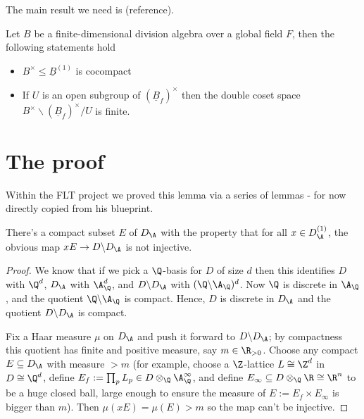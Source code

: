 The main result we need is (reference).%

\begin{lemma}\label{Fujisaki}
    Let $B$ be a finite-dimensional division algebra over a global field $F$, then the following
    statements hold
    \begin{itemize}
        \item $B^\times \leq \underline{B}^{(1)}$ is cocompact
        \item If $U$ is an open subgroup of $(\underline{B}_f )^\times$
          then the double coset space $B^\times \backslash (\underline{B}_f)^\times /U$ is finite.
    \end{itemize}
\end{lemma}


\section{The proof}

Within the FLT project we proved this lemma via a series of lemmas - for now directly copied from
his blueprint.


\begin{lemma}
  \label{NumberField.AdeleRing.DivisionAlgebra.Aux.existsE}
  \leanok
  There's a compact subset $E$ of $D_{\A}$
  with the property that for all $x\in D_{\A}^{(1)}$,
  the obvious map $xE\to D\backslash D_{\A}$ is not injective.
\end{lemma}

\begin{proof}
  \leanok
  We know that if we pick a $\Q$-basis for $D$ of size $d$ then this identifies $D$ with $\Q^d$,
  $D_{\A}$ with $\A_{\Q}^d$, and $D\backslash D_{\A}$ with $(\Q\backslash\A_{\Q})^d$. Now $\Q$ is
  discrete in $\A_{\Q}$, and the quotient $\Q\backslash \A_{\Q}$ is compact.
  Hence, $D$ is discrete in $D_{\A}$ and the quotient $D\backslash D_{\A}$ is compact.

  Fix a Haar measure $\mu$ on $D_{\A}$ and push it forward to $D\backslash D_{\A}$; by compactness
  this quotient has finite and positive measure, say $m\in\R_{>0}$. Choose any compact
  $E\subseteq D_{\A}$ with measure $> m$ (for example, choose a $\Z$-lattice $L\cong\Z^d$ in
  $D\cong\Q^d$, define $E_f:=\prod_p L_p\in D\otimes_{\Q}\A_{\Q}^\infty$, and define
  $E_{\infty}\subseteq D\otimes_{\Q}\R\cong\R^n$ to be a huge closed ball, large enough to ensure
  the measure of $E:=E_f\times E_{\infty}$ is bigger than $m$). Then $\mu(xE)=\mu(E)>m$ so the map
  can't be injective.
\end{proof}

